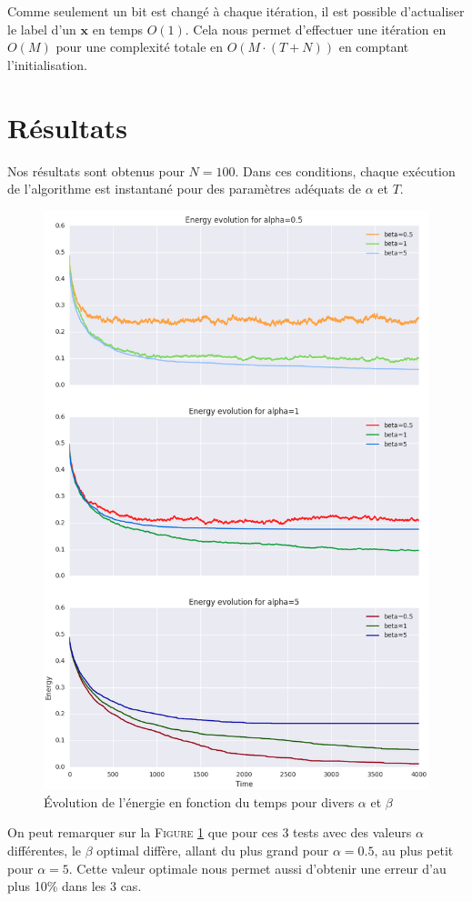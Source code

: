 \documentclass[twocolumn]{article}
\begin{document}
		Comme seulement un bit est changé à chaque itération, il est possible d'actualiser le label d'un $\mathbf{x}$ en temps $O(1)$. Cela nous permet d'effectuer une itération en $O(M)$ pour une complexité totale en $O(M\cdot(T + N))$ en comptant l'initialisation.
		
	\section{Résultats}
		Nos résultats sont obtenus pour $N=100$. Dans ces conditions, chaque exécution de l'algorithme est instantané pour des paramètres adéquats de $\alpha$ et $T$.
		\begin{figure}
			\includegraphics[width=\columnwidth]{../tobekept/ex1_1755923751722050074-r.png}
			\caption{\label{ex1}Évolution de l'énergie en fonction du temps pour divers $\alpha$ et $\beta$}
		\end{figure}
		On peut remarquer sur la \textsc{Figure} \ref{ex1} que pour ces 3 tests avec des valeurs $\alpha$ différentes, le $\beta$ optimal diffère, allant du plus grand pour $\alpha = 0.5$, au plus petit pour $\alpha = 5$.
		Cette valeur optimale nous permet aussi d'obtenir une erreur d'au plus 10\% dans les 3 cas.
		
\end{document}

